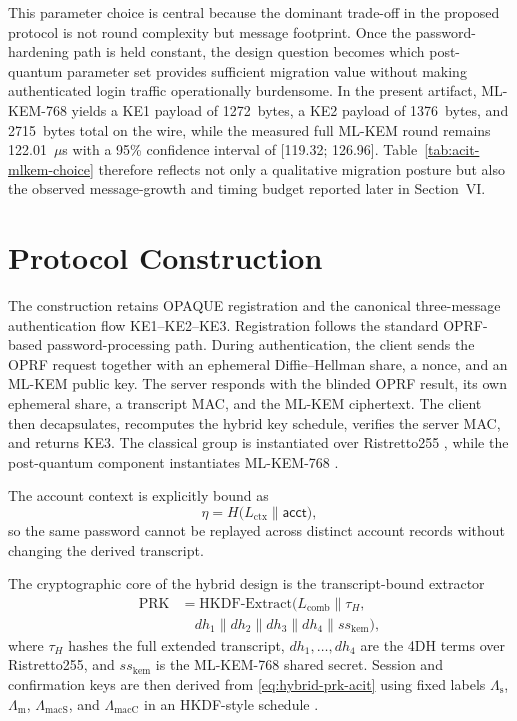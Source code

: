 \documentclass[conference]{IEEEtran}
\newcommand{\acct}{\mathsf{acct}}
\newcommand{\Label}[1]{L_{\mathrm{#1}}}
\newcommand{\KLabel}[1]{\Lambda_{\mathrm{#1}}}
\begin{document}
This parameter choice is central because the dominant trade-off in the proposed protocol is not round complexity but message footprint. Once the password-hardening path is held constant, the design question becomes which post-quantum parameter set provides sufficient migration value without making authenticated login traffic operationally burdensome. In the present artifact, ML-KEM-768 yields a KE1 payload of 1272~bytes, a KE2 payload of 1376~bytes, and 2715~bytes total on the wire, while the measured full ML-KEM round remains 122.01~$\mu$s with a 95\% confidence interval of [119.32; 126.96]. Table~\ref{tab:acit-mlkem-choice} therefore reflects not only a qualitative migration posture but also the observed message-growth and timing budget reported later in Section~VI.

\section{Protocol Construction}

The construction retains OPAQUE registration and the canonical three-message authentication flow KE1--KE2--KE3. Registration follows the standard OPRF-based password-processing path. During authentication, the client sends the OPRF request together with an ephemeral Diffie--Hellman share, a nonce, and an ML-KEM public key. The server responds with the blinded OPRF result, its own ephemeral share, a transcript MAC, and the ML-KEM ciphertext. The client then decapsulates, recomputes the hybrid key schedule, verifies the server MAC, and returns KE3. The classical group is instantiated over Ristretto255 \cite{devalence2024}, while the post-quantum component instantiates ML-KEM-768 \cite{fips203}.

The account context is explicitly bound as
\begin{equation}
\eta = H\!\bigl(\Label{ctx} \| \acct\bigr),
\label{eq:acct-context-acit}
\end{equation}
so the same password cannot be replayed across distinct account records without changing the derived transcript.

The cryptographic core of the hybrid design is the transcript-bound extractor
\begin{equation}
\begin{aligned}
\mathrm{PRK} &=
\mathrm{HKDF\text{-}Extract}\!\bigl(
\Label{comb} \| \tau_H, \\
&\quad dh_1 \| dh_2 \| dh_3 \| dh_4 \| ss_{\mathrm{kem}}
\bigr),
\end{aligned}
\label{eq:hybrid-prk-acit}
\end{equation}
where $\tau_H$ hashes the full extended transcript, $dh_1,\dots,dh_4$ are the 4DH terms over Ristretto255, and $ss_{\mathrm{kem}}$ is the ML-KEM-768 shared secret. Session and confirmation keys are then derived from \eqref{eq:hybrid-prk-acit} using fixed labels $\KLabel{s}$, $\KLabel{m}$, $\KLabel{macS}$, and $\KLabel{macC}$ in an HKDF-style schedule \cite{krawczyk2010}.
\end{document}
